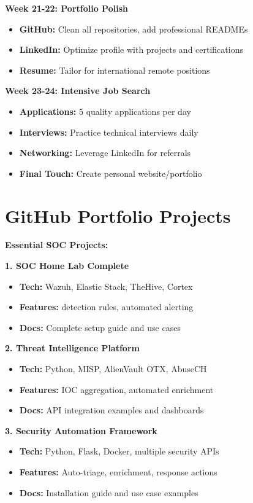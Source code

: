 \documentclass[11pt,a4paper]{article}
\begin{document}
\textbf{Week 21-22: Portfolio Polish}
\begin{itemize}
    \item \textbf{GitHub:} Clean all repositories, add professional READMEs
    \item \textbf{LinkedIn:} Optimize profile with projects and certifications
    \item \textbf{Resume:} Tailor for international remote positions
\end{itemize}

\textbf{Week 23-24: Intensive Job Search}
\begin{itemize}
    \item \textbf{Applications:} 5 quality applications per day
    \item \textbf{Interviews:} Practice technical interviews daily
    \item \textbf{Networking:} Leverage LinkedIn for referrals
    \item \textbf{Final Touch:} Create personal website/portfolio
\end{itemize}

\section*{GitHub Portfolio Projects}

\textbf{\color{cyberblue} Essential SOC Projects:}

\textbf{1. SOC Home Lab Complete}
\begin{itemize}
    \item \textbf{Tech:} Wazuh, Elastic Stack, TheHive, Cortex
    \item \textbf{Features:} detection rules, automated alerting
    \item \textbf{Docs:} Complete setup guide and use cases
\end{itemize}

\textbf{2. Threat Intelligence Platform}
\begin{itemize}
    \item \textbf{Tech:} Python, MISP, AlienVault OTX, AbuseCH
    \item \textbf{Features:} IOC aggregation, automated enrichment
    \item \textbf{Docs:} API integration examples and dashboards
\end{itemize}

\textbf{3. Security Automation Framework}
\begin{itemize}
    \item \textbf{Tech:} Python, Flask, Docker, multiple security APIs
    \item \textbf{Features:} Auto-triage, enrichment, response actions
    \item \textbf{Docs:} Installation guide and use case examples
\end{itemize}
\end{document}
